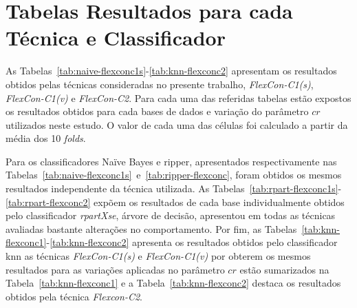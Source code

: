 

\apendices
    \chapter{Tabelas Resultados para cada Técnica e Classificador}
        \label{apen:all-results}
        As Tabelas~\ref{tab:naive-flexconc1s}-\ref{tab:knn-flexconc2} apresentam os resultados obtidos pelas técnicas consideradas no presente trabalho, \textit{FlexCon\hyp{C1(s)}}, \textit{FlexCon\hyp{C1(v)}} e \textit{FlexCon\hyp{C2}}. Para cada uma das referidas tabelas estão expostos os resultados obtidos para cada bases de dados e variação do parâmetro $cr$ utilizados neste estudo. O valor de cada uma das células foi calculado a partir da média dos 10 \textit{folds}.
        
        Para os classificadores Naïve Bayes e \ac{ripper}, apresentados respectivamente nas Tabelas~\ref{tab:naive-flexconc1s}~e~\ref{tab:ripper-flexconc}, foram obtidos os mesmos resultados independente da técnica utilizada. As Tabelas~\ref{tab:rpart-flexconc1s}-\ref{tab:rpart-flexconc2} expõem os resultados de cada base individualmente obtidos pelo classificador \textit{rpartXse}, árvore de decisão, apresentou em todas as técnicas avaliadas bastante alterações no comportamento. Por fim, as Tabelas~\ref{tab:knn-flexconc1}-\ref{tab:knn-flexconc2} apresenta os resultados obtidos pelo classificador \ac{knn} as técnicas \textit{FlexCon\hyp{C1(s)}} e \textit{FlexCon\hyp{C1(v)}} por obterem os mesmos resultados para as variações aplicadas no parâmetro $cr$ estão sumarizados na Tabela~\ref{tab:knn-flexconc1} e a Tabela~\ref{tab:knn-flexconc2} destaca os resultados obtidos pela técnica \textit{Flexcon\hyp{C2}}.
        \newpage
        
